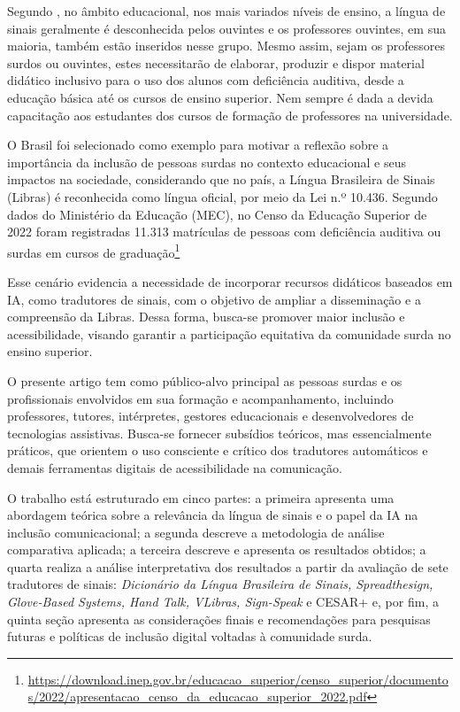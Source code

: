 \documentclass[portuguese]{textolivre}
\begin{document}
Segundo \textcite{LopesGoettert2015}, no âmbito educacional, nos mais variados níveis de ensino, a língua de sinais geralmente é desconhecida pelos ouvintes e os professores ouvintes, em sua maioria, também estão inseridos nesse grupo. Mesmo assim, sejam os professores surdos ou ouvintes, estes necessitarão de elaborar, produzir e dispor material didático inclusivo para o uso dos alunos com deficiência auditiva, desde a educação básica até os cursos de ensino superior. Nem sempre é dada a devida capacitação aos estudantes dos cursos de formação de professores na universidade.

O Brasil foi selecionado como exemplo para motivar a reflexão sobre a importância da inclusão de pessoas surdas no contexto educacional e seus impactos na sociedade, considerando que no país, a Língua Brasileira de Sinais (Libras) é reconhecida como língua oficial, por meio da Lei n.º 10.436. Segundo dados do Ministério da Educação (MEC), no Censo da Educação Superior de 2022 foram registradas 11.313 matrículas de pessoas com deficiência auditiva ou surdas em cursos de graduação\footnote{\url{https://download.inep.gov.br/educacao_superior/censo_superior/documentos/2022/apresentacao_censo_da_educacao_superior_2022.pdf}}

Esse cenário evidencia a necessidade de incorporar recursos didáticos baseados em IA, como tradutores de sinais, com o objetivo de ampliar a disseminação e a compreensão da Libras. Dessa forma, busca-se promover maior inclusão e acessibilidade, visando garantir a participação equitativa da comunidade surda no ensino superior.

O presente artigo tem como público-alvo principal as pessoas surdas e os profissionais envolvidos em sua formação e acompanhamento, incluindo professores, tutores, intérpretes, gestores educacionais e desenvolvedores de tecnologias assistivas. Busca-se fornecer subsídios teóricos, mas essencialmente práticos, que orientem o uso consciente e crítico dos tradutores automáticos e demais ferramentas digitais de acessibilidade na comunicação.

O trabalho está estruturado em cinco partes: a primeira apresenta uma abordagem teórica sobre a relevância da língua de sinais e o papel da IA na inclusão comunicacional; a segunda descreve a metodologia de análise comparativa aplicada; a terceira descreve e apresenta os resultados obtidos; a quarta realiza a análise interpretativa dos resultados a partir da avaliação de sete tradutores de sinais: \textit{Dicionário da Língua Brasileira de Sinais, Spreadthesign, Glove-Based Systems, Hand Talk, VLibras, Sign-Speak} e CESAR+ e, por fim, a quinta seção apresenta as considerações finais e recomendações para pesquisas futuras e políticas de inclusão digital voltadas à comunidade surda.
\end{document}
